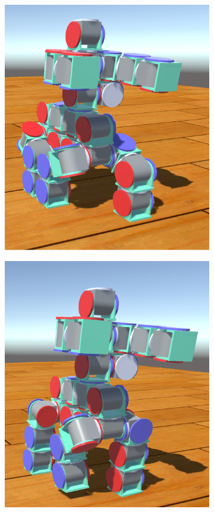 \documentclass[graybox]{svmult}
\begin{document}
\begin{figure}
\begin{center}
\begin{subfigure}[b]{0.23\columnwidth}
                \includegraphics[width=\textwidth]{images/library/unity/step2.png}
                \caption{}
                \label{fig:step2}
        \end{subfigure}
        \begin{subfigure}[b]{0.23\columnwidth}
                \includegraphics[width=\textwidth]{images/library/unity/step3.png}

\end{subfigure}
\end{center}
\end{figure}
\end{document}

